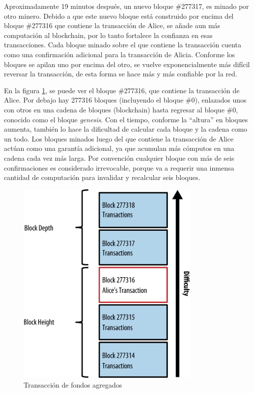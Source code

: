 \documentclass[10pt,journal,compsoc]{IEEEtran}
\begin{document}
Aproximadamente 19 minutos después, un nuevo bloque \#277317, es minado por otro minero. Debido a que este nuevo bloque está construido por encima del bloque \#277316 que contiene la transacción de Alice, se añade aun más computación al blockchain, por lo tanto fortalece la confianza en esas transacciones. Cada bloque minado sobre el que contiene la transacción cuenta como una confirmación adicional para la transacción de Alicia. Conforme los bloques se apilan uno por encima del otro, se vuelve exponencialmente más difícil reversar la transacción, de esta forma se hace más y más confiable por la red.

En la figura \ref{fig:block}, se puede ver el bloque \#277316, que contiene la transacción de Alice. Por debajo hay 277316 bloques (incluyendo el bloque \#0), enlazados unos con otros en una cadena de bloques (blockchain) hasta regresar al bloque \#0, conocido como el bloque \emph{genesis}. Con el tiempo, conforme la ``altura'' en bloques aumenta, también lo hace la dificultad de calcular cada bloque y la cadena como un todo. Los bloques minados luego del que contiene la transacción de Alice actúan como una garantía adicional, ya que acumulan más cómputos en una cadena cada vez más larga. Por convención cualquier bloque con más de seis confirmaciones es considerado irrevocable, porque va a requerir una inmensa cantidad de computación para invalidar y recalcular seis bloques.

\begin{figure}[h]
    \center
    \includegraphics[width=9cm]{block}
    \caption{Transacción de fondos agregados}
    \label{fig:block}
\end{figure}
\end{document}
